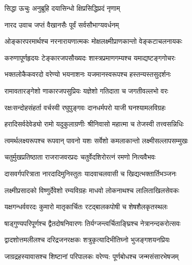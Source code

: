 

सिद्धा  ऊचुः
{अनुब्रूहि  दयासिन्धो  क्षिप्रसिद्धिप्रदं  नृणाम्}

नारद  उवाच
{जप्तं  वैखानसैः  पूर्वं  सर्वसौभाग्यवर्धनम्}

\twolineshloka
{ओङ्कारपरमार्थश्च  नरनारायणात्मकः}
{मोक्षलक्ष्मीप्राणकान्तो वेङ्कटाचलनायकः}

\twolineshloka
{करुणापूर्णहृदयः टेङ्कारजपसौख्यदः}
{शास्त्रप्रमाणगम्यश्च यमाद्यष्टङ्गगोचरः}
    
\twolineshloka
{भक्तलोकैकवरदो वरेण्यो भयनाशनः}
{यजमानस्वरूपश्च हस्तन्यस्तसुदर्शनः}
        
\twolineshloka
{रामावतारङ्गेशो णाकारजपसुप्रियः}
{यज्ञेशो गतिदाता च जगतीवल्लभो वरः}
            
\twolineshloka
{रक्षःसन्दोहसंहर्ता वर्चस्वी रघुपुङ्गवः}
{दानधर्मपरो याजी घनश्यामलविग्रहः}
                
\twolineshloka
{हरादिसर्वदेवेड्यो रामो यदुकुलाग्रणीः}
{श्रीनिवासो महात्मा च तेजस्वी तत्त्वसन्निधिः}
                    
\twolineshloka
{त्वमर्थलक्ष्यरूपश्च रूपवान् पावनो यशः}
{सर्वेशो कमलाकान्तो लक्ष्मीसल्लापसम्मुखः}
                        
\twolineshloka
{चतुर्मुखप्रतिष्ठाता राजराजवरप्रदः}
{चतुर्वेदशिरोरत्नं रमणो नित्यवैभवः }
                            
\twolineshloka
{दासवर्गपरित्राता नारदादिमुनिस्तुतः}
{यादवाचलवासी च खिद्यत्भक्तार्तिभञ्जनः }
                                
\twolineshloka
{लक्ष्मीप्रसादको विष्णुर्देवेशो रम्यविग्रहः}
{माधवो लोकनाथश्च लालिताखिलसेवकः }
                                    
\twolineshloka
{यक्षगन्धर्ववरदः कुमारो मातृकार्चितः}
{रटद्बालकपोषी च शेषशैलकृतस्थलः }
                                        
\twolineshloka
{षाड्गुण्यपरिपूर्णश्च द्वैतदोषनिवारणः}
{तिर्यग्जन्त्वर्चिताङ्घ्रिश्च नेत्रानन्दकरोत्सवः }
                                            
\twolineshloka
{द्वादशोत्तमलीलश्च दरिद्रजनरक्षकः}
{शत्रुकृत्यादिभीतिघ्नो भुजङ्गशयनप्रियः}
                                                
\twolineshloka
{जाग्रद्रहस्यावासश्च शिष्टानां  परिपालकः}
{वरेण्य: पूर्णबोधश्च जन्मसंसारभेषजम् }
                                                    

